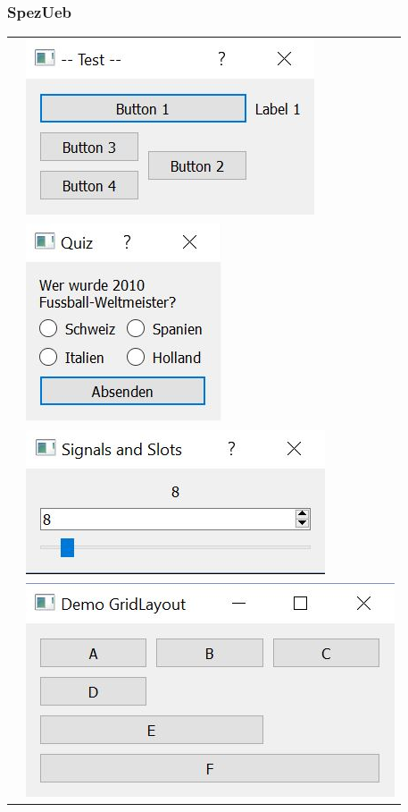 \subsubsection{SpezUeb}
\begin{longtable}{l l} %
    &
    \hspace{-2cm}\includegraphics{images/qtSpezUeb1.jpg}
    \\
    &
    \includegraphics{images/qtSpezUeb2.jpg}
    \\
    &
    \hspace{-2cm}\includegraphics{images/qtSpezUeb3.jpg}
    \\
    &
    \hspace{-2cm}\includegraphics{images/GridLayout.jpg}    
\end{longtable}

